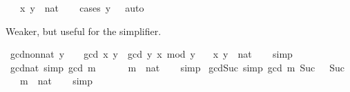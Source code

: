 \begin{isabellebody}
\ \ \ x\ y\ {\isacharcolon}{\kern0pt}{\isacharcolon}{\kern0pt}\ nat\isanewline
%
\isadelimproof
\ \ %
\endisadelimproof
%
\isatagproof
{}\isamarkupfalse%
\ {\isacharparenleft}{\kern0pt}cases\ {\isachardoublequoteopen}y\ {\isacharequal}{\kern0pt}\ {}{\isachardoublequoteclose}{\isacharparenright}{\kern0pt}\ auto%
\endisatagproof
{\isafoldproof}%
%
\isadelimproof
%
\endisadelimproof
%
\begin{isamarkuptext}%
Weaker, but useful for the simplifier.%
\end{isamarkuptext}\isamarkuptrue%
\isamarkupfalse%
\ gcd{\isacharunderscore}{\kern0pt}non{\isacharunderscore}{\kern0pt}{}{\isacharunderscore}{\kern0pt}nat{\isacharcolon}{\kern0pt}\ {\isachardoublequoteopen}y\ {\isasymnoteq}\ {}\ {\isasymLongrightarrow}\ gcd\ x\ y\ {\isacharequal}{\kern0pt}\ gcd\ y\ {\isacharparenleft}{\kern0pt}x\ mod\ y{\isacharparenright}{\kern0pt}{\isachardoublequoteclose}\isanewline
\ \ \ x\ y\ {\isacharcolon}{\kern0pt}{\isacharcolon}{\kern0pt}\ nat\isanewline
%
\isadelimproof
\ \ %
\endisadelimproof
%
\isatagproof
{}\isamarkupfalse%
\ simp%
\endisatagproof
{\isafoldproof}%
%
\isadelimproof
\isanewline
%
\endisadelimproof
\isanewline
{}\isamarkupfalse%
\ gcd{\isacharunderscore}{\kern0pt}{}{\isacharunderscore}{\kern0pt}nat\ {\isacharbrackleft}{\kern0pt}simp{\isacharbrackright}{\kern0pt}{\isacharcolon}{\kern0pt}\ {\isachardoublequoteopen}gcd\ m\ {}\ {\isacharequal}{\kern0pt}\ {}{\isachardoublequoteclose}\isanewline
\ \ \ m\ {\isacharcolon}{\kern0pt}{\isacharcolon}{\kern0pt}\ nat\isanewline
%
\isadelimproof
\ \ %
\endisadelimproof
%
\isatagproof
{}\isamarkupfalse%
\ simp%
\endisatagproof
{\isafoldproof}%
%
\isadelimproof
\isanewline
%
\endisadelimproof
\isanewline
{}\isamarkupfalse%
\ gcd{\isacharunderscore}{\kern0pt}Suc{\isacharunderscore}{\kern0pt}{}\ {\isacharbrackleft}{\kern0pt}simp{\isacharbrackright}{\kern0pt}{\isacharcolon}{\kern0pt}\ {\isachardoublequoteopen}gcd\ m\ {\isacharparenleft}{\kern0pt}Suc\ {}{\isacharparenright}{\kern0pt}\ {\isacharequal}{\kern0pt}\ Suc\ {}{\isachardoublequoteclose}\isanewline
\ \ \ m\ {\isacharcolon}{\kern0pt}{\isacharcolon}{\kern0pt}\ nat\isanewline
%
\isadelimproof
\ \ %
\endisadelimproof
%
\isatagproof
{}\isamarkupfalse%
\ simp%
\endisatagproof
{\isafoldproof}%
%
\isadelimproof
\isanewline
%
\endisadelimproof
\isanewline

\end{isabellebody}

